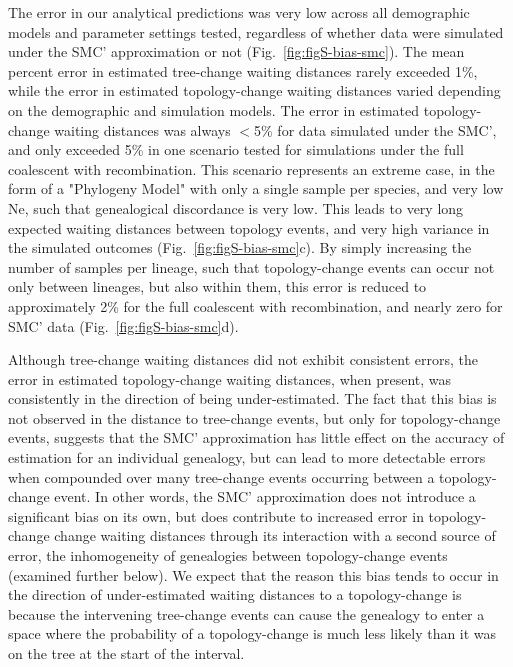 \documentclass[11pt]{article}
\begin{document}
The error in our analytical predictions was very low across all demographic
models and parameter settings tested, regardless of whether data were simulated
under the SMC' approximation or not
(Fig.~\ref{fig:figS-bias-smc}). 
% 
The mean percent error in estimated tree-change waiting distances 
rarely exceeded 1\%, while the error in estimated topology-change 
waiting distances varied depending on the demographic and simulation 
models.
% 
The error in estimated topology-change waiting distances was always
$<$5\% for data simulated under the SMC', and only exceeded 5\% in
one scenario tested for simulations under the full coalescent with
recombination. This scenario represents an extreme case, in the form of
a "Phylogeny Model" with only a single sample per species, and very low 
Ne, such that genealogical discordance is very low. This leads to very 
long expected waiting distances between topology events, and very high 
variance in the simulated outcomes (Fig.~\ref{fig:figS-bias-smc}c). 
By simply increasing the number of samples per lineage, such that 
topology-change events can occur not only between lineages, but also 
within them, this error is reduced to approximately 2\% for the full 
coalescent with recombination, and nearly zero for SMC' data 
(Fig.~\ref{fig:figS-bias-smc}d). 


Although tree-change waiting distances did not exhibit consistent errors,
the error in estimated topology-change waiting distances, when present,
was consistently in the direction of being under-estimated. The fact that
this bias is not observed in the distance to tree-change events, but only
for topology-change events, suggests that the SMC' approximation has
little effect on the accuracy of estimation for an individual genealogy,
but can lead to more detectable errors when compounded over many tree-change
events occurring between a topology-change event.
% 
In other words, the SMC' approximation does not introduce a significant
bias on its own, but does contribute to increased error in topology-change 
change waiting distances through its interaction with a second source of error,
the inhomogeneity of genealogies between topology-change events (examined
further below). 
% 
We expect that the reason this bias tends to occur in the direction
of under-estimated waiting distances to a topology-change is because 
the intervening tree-change events can cause the genealogy to enter a 
space where the probability of a topology-change is much less likely 
than it was on the tree at the start of the interval. 
\end{document}
